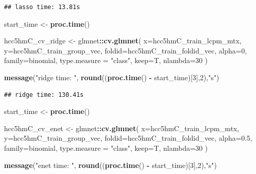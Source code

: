 \documentclass[
]{book}
\newenvironment{Shaded}{\begin{snugshade}}{\end{snugshade}}
\newcommand{\DataTypeTok}[1]{\textcolor[rgb]{0.13,0.29,0.53}{#1}}
\newcommand{\DecValTok}[1]{\textcolor[rgb]{0.00,0.00,0.81}{#1}}
\newcommand{\FloatTok}[1]{\textcolor[rgb]{0.00,0.00,0.81}{#1}}
\newcommand{\KeywordTok}[1]{\textcolor[rgb]{0.13,0.29,0.53}{\textbf{#1}}}
\newcommand{\NormalTok}[1]{#1}
\newcommand{\OperatorTok}[1]{\textcolor[rgb]{0.81,0.36,0.00}{\textbf{#1}}}
\newcommand{\StringTok}[1]{\textcolor[rgb]{0.31,0.60,0.02}{#1}}
\begin{document}
\begin{verbatim}
## lasso time: 13.81s
\end{verbatim}

\begin{Shaded}
\begin{Highlighting}[]
\NormalTok{start\_time <{-}}\StringTok{  }\KeywordTok{proc.time}\NormalTok{()}

\NormalTok{hcc5hmC\_cv\_ridge <{-}}\StringTok{ }\NormalTok{glmnet}\OperatorTok{::}\KeywordTok{cv.glmnet}\NormalTok{(}
 \DataTypeTok{x=}\NormalTok{hcc5hmC\_train\_lcpm\_mtx,}
 \DataTypeTok{y=}\NormalTok{hcc5hmC\_train\_group\_vec,}
 \DataTypeTok{foldid=}\NormalTok{hcc5hmC\_train\_foldid\_vec,}
 \DataTypeTok{alpha=}\DecValTok{0}\NormalTok{,}
 \DataTypeTok{family=}\StringTok{\textquotesingle{}binomial\textquotesingle{}}\NormalTok{, }
 \DataTypeTok{type.measure =} \StringTok{"class"}\NormalTok{,}
 \DataTypeTok{keep=}\NormalTok{T,}
 \DataTypeTok{nlambda=}\DecValTok{30}
\NormalTok{)}

\KeywordTok{message}\NormalTok{(}\StringTok{"ridge time: "}\NormalTok{, }\KeywordTok{round}\NormalTok{((}\KeywordTok{proc.time}\NormalTok{() }\OperatorTok{{-}}\StringTok{ }\NormalTok{start\_time)[}\DecValTok{3}\NormalTok{],}\DecValTok{2}\NormalTok{),}\StringTok{"s"}\NormalTok{)}
\end{Highlighting}
\end{Shaded}

\begin{verbatim}
## ridge time: 130.41s
\end{verbatim}

\begin{Shaded}
\begin{Highlighting}[]
\NormalTok{start\_time <{-}}\StringTok{  }\KeywordTok{proc.time}\NormalTok{()}

\NormalTok{hcc5hmC\_cv\_enet <{-}}\StringTok{ }\NormalTok{glmnet}\OperatorTok{::}\KeywordTok{cv.glmnet}\NormalTok{(}
 \DataTypeTok{x=}\NormalTok{hcc5hmC\_train\_lcpm\_mtx,}
 \DataTypeTok{y=}\NormalTok{hcc5hmC\_train\_group\_vec,}
 \DataTypeTok{foldid=}\NormalTok{hcc5hmC\_train\_foldid\_vec,}
 \DataTypeTok{alpha=}\FloatTok{0.5}\NormalTok{,}
 \DataTypeTok{family=}\StringTok{\textquotesingle{}binomial\textquotesingle{}}\NormalTok{,}
 \DataTypeTok{type.measure =} \StringTok{"class"}\NormalTok{,}
 \DataTypeTok{keep=}\NormalTok{T,}
 \DataTypeTok{nlambda=}\DecValTok{30}
\NormalTok{)}

\KeywordTok{message}\NormalTok{(}\StringTok{"enet time: "}\NormalTok{, }\KeywordTok{round}\NormalTok{((}\KeywordTok{proc.time}\NormalTok{() }\OperatorTok{{-}}\StringTok{ }\NormalTok{start\_time)[}\DecValTok{3}\NormalTok{],}\DecValTok{2}\NormalTok{),}\StringTok{"s"}\NormalTok{)}
\end{Highlighting}
\end{Shaded}
\end{document}
